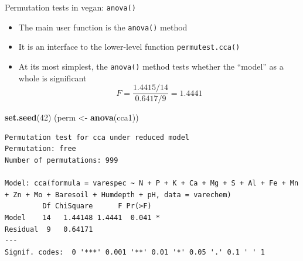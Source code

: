 \documentclass[10pt,ignorenonframetext,compress, aspectratio=169]{beamer}
\newenvironment{Shaded}{\begin{snugshade}}{\end{snugshade}}
\newcommand{\KeywordTok}[1]{\textcolor[rgb]{0.13,0.29,0.53}{\textbf{{#1}}}}
\newcommand{\DecValTok}[1]{\textcolor[rgb]{0.00,0.00,0.81}{{#1}}}
\newcommand{\StringTok}[1]{\textcolor[rgb]{0.31,0.60,0.02}{{#1}}}
\newcommand{\NormalTok}[1]{{#1}}
\providecommand{\tightlist}{%
  \setlength{\itemsep}{0pt}\setlength{\parskip}{0pt}}
\begin{document}
\begin{frame}[fragile]{Permutation tests in vegan: \texttt{anova()}}

\begin{itemize}
\tightlist
\item
  The main user function is the \texttt{anova()} method
\item
  It is an interface to the lower-level function
  \texttt{permutest.cca()}
\item
  At its most simplest, the \texttt{anova()} method tests whether the
  ``model'' as a whole is significant
  \[F = \frac{1.4415 / 14}{0.6417 / 9} = 1.4441\]
\end{itemize}

\tiny

\begin{Shaded}
\begin{Highlighting}[]
\KeywordTok{set.seed}\NormalTok{(}\DecValTok{42}\NormalTok{)}
\NormalTok{(perm <-}\StringTok{ }\KeywordTok{anova}\NormalTok{(cca1))}
\end{Highlighting}
\end{Shaded}

\begin{verbatim}
Permutation test for cca under reduced model
Permutation: free
Number of permutations: 999

Model: cca(formula = varespec ~ N + P + K + Ca + Mg + S + Al + Fe + Mn + Zn + Mo + Baresoil + Humdepth + pH, data = varechem)
         Df ChiSquare      F Pr(>F)  
Model    14   1.44148 1.4441  0.041 *
Residual  9   0.64171                
---
Signif. codes:  0 '***' 0.001 '**' 0.01 '*' 0.05 '.' 0.1 ' ' 1
\end{verbatim}

\normalsize

\end{frame}
\end{document}
